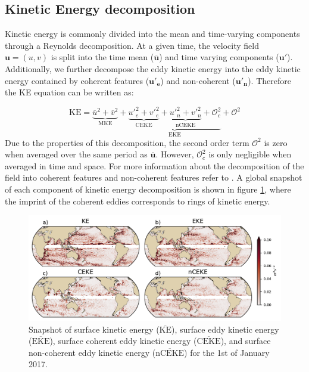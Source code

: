 \documentclass[draft,linenumbers]{agujournal2019}
\newcommand{\MKE}{\overline{\textrm{KE}}}
\newcommand{\mKE}{\textrm{MKE}}
\newcommand{\MEKE}{\overline{\textrm{EKE}}}
\newcommand{\EKE}{\textrm{EKE}}
\newcommand{\MCEKE}{\overline{\textrm{CEKE}}}
\newcommand{\CEKE}{\textrm{CEKE}}
\newcommand{\MnCEKE}{\overline{\textrm{nCEKE}}}
\newcommand{\nCEKE}{\textrm{nCEKE}}
\begin{document}
	\subsection{Kinetic Energy decomposition}

	Kinetic energy is commonly divided into the mean and time-varying components through a Reynolds decomposition. At a given time, the velocity field $\mathbf{u} = (u,v)$ is split into the time mean ($\mathbf{\overline{u}}$) and time varying components ($\mathbf{u'}$). Additionally, we further decompose the eddy kinetic energy into the eddy kinetic energy contained by coherent features ($\mathbf{u'_e}$) and non-coherent ($\mathbf{u'_n}$). Therefore the KE equation can be written as:
	
	\begin{equation}
		\mathrm{KE} = \underbrace{\overline{u}^2 + \overline{v}^2}_{\mKE} + 
		\underbrace{\underbrace{{u'}_e^2+{v'}_e^2}_{\CEKE}  + \underbrace{{u'}_n^2+{v'}_n^2}_{\nCEKE} + \mathcal{O}_c^2 }_{\EKE} + \mathcal{O}^2
	\end{equation}
	Due to the properties of this decomposition, the second order term $\mathcal{O}^2$ is zero when averaged over the same period as $\mathbf{\overline{u}}$. However, $\mathcal{O}_c^2$ is only negligible when averaged in time and space. For more information about the decomposition of the field into coherent features and non-coherent features refer to \citet{Martinez_Kinetic_2019}. A global snapshot of each component of kinetic energy decomposition is shown in figure \ref{fig:eddy_snapshot}, where the imprint of the coherent eddies corresponds to rings of kinetic energy.

	\begin{figure}
	    \centering
	    \includegraphics[width=1\textwidth]{figures/snapshot_ke_maps_satellite.pdf}
	    \caption{Snapshot of surface kinetic energy ($\MKE$), surface eddy kinetic energy ($\MEKE$), surface coherent eddy kinetic energy ($\MCEKE$), and surface non-coherent eddy kinetic energy ($\MnCEKE$) for the 1st of January 2017.}
	    \label{fig:eddy_snapshot}
	\end{figure}
\end{document}
